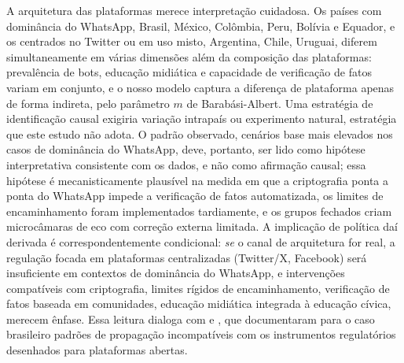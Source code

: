 \documentclass[12pt,a4paper]{article}
\theoremstyle{definition}
\theoremstyle{plain}
\begin{document}
A arquitetura das plataformas merece interpretação cuidadosa. Os países com dominância do WhatsApp, Brasil, México, Colômbia, Peru, Bolívia e Equador, e os centrados no Twitter ou em uso misto, Argentina, Chile, Uruguai, diferem simultaneamente em várias dimensões além da composição das plataformas: prevalência de bots, educação midiática e capacidade de verificação de fatos variam em conjunto, e o nosso modelo captura a diferença de plataforma apenas de forma indireta, pelo parâmetro $m$ de Barabási-Albert. Uma estratégia de identificação causal exigiria variação intrapaís ou experimento natural, estratégia que este estudo não adota. O padrão observado, cenários base mais elevados nos casos de dominância do WhatsApp, deve, portanto, ser lido como hipótese interpretativa consistente com os dados, e não como afirmação causal; essa hipótese é mecanisticamente plausível na medida em que a criptografia ponta a ponta do WhatsApp impede a verificação de fatos automatizada, os limites de encaminhamento foram implementados tardiamente, e os grupos fechados criam microcâmaras de eco com correção externa limitada. A implicação de política daí derivada é correspondentemente condicional: \emph{se} o canal de arquitetura for real, a regulação focada em plataformas centralizadas (Twitter/X, Facebook) será insuficiente em contextos de dominância do WhatsApp, e intervenções compatíveis com criptografia, limites rígidos de encaminhamento, verificação de fatos baseada em comunidades, educação midiática integrada à educação cívica, merecem ênfase. Essa leitura dialoga com \citet{machado2019whatsapp} e \citet{resende2019misinformation}, que documentaram para o caso brasileiro padrões de propagação incompatíveis com os instrumentos regulatórios desenhados para plataformas abertas.
\end{document}
